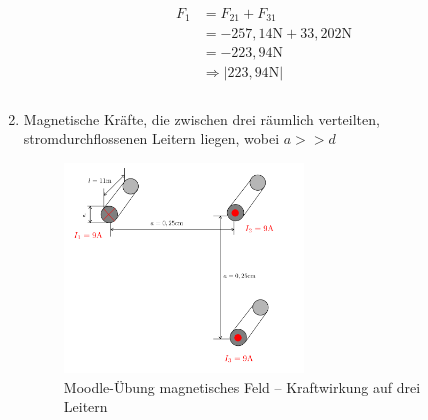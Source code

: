 \begin{enumerate}
        \begin{align*}
          F_{1} & = F_{21}+F_{31}                   \\
                & =-257,14\text{N} + 33,202\text{N} \\
                & = -223,94\text{N}                 \\
                & \Rightarrow |223,94\text{N}|      \\                                                                                                                                                              \\
        \end{align*}

  \item Magnetische Kräfte, die zwischen drei räumlich verteilten, stromdurchflossenen Leitern liegen, wobei  $a>> d$


        \begin{figure}[h!]
          \begin{center}
            \includegraphics[width=0.6\textwidth]{img/Magnetisches-Feld/A2.png}
          \end{center}
          \caption{Moodle-Übung magnetisches Feld – Kraftwirkung auf drei Leitern}
        \end{figure}


\end{enumerate}

